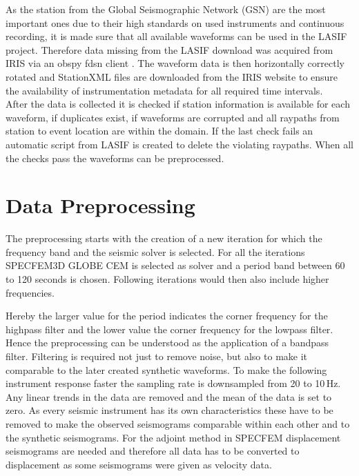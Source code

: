 As the station from the Global Seismographic Network (GSN) are the most important ones due to their high standards on used 
instruments and continuous recording, it is made sure that all available waveforms can be used in the LASIF project. 
Therefore data missing from the LASIF download was acquired from IRIS via an obspy fdsn client \citep{Krischer2015}. 
The waveform data is then horizontally correctly rotated and StationXML files are downloaded from the IRIS website to
ensure the availability of instrumentation metadata for all required time intervals. \\

After the data is collected it is checked if station information is available for each waveform, if duplicates exist, if 
waveforms are corrupted and all raypaths from station to event location are within the domain. 
If the last check fails an automatic script from LASIF is created to delete the violating raypaths. 
When all the checks pass the waveforms can be preprocessed. 



\section{Data Preprocessing}

The preprocessing starts with the creation of a new iteration for which the frequency band and the seismic solver is selected.
For all the iterations SPECFEM3D GLOBE CEM is selected as solver and a period band between 60 to 120 seconds is chosen.
Following iterations would then also include higher frequencies.


Hereby the larger value for the period indicates the corner frequency for the highpass filter and the lower value the 
corner frequency for the lowpass filter. Hence the preprocessing can be understood as the application of a bandpass filter. 
Filtering is required not just to remove noise, but also to make it comparable to the later created synthetic waveforms.
To make the following instrument response faster the sampling rate is downsampled from 20 to 10$\,$Hz.
Any linear trends in the data are removed and the mean of the data is set to zero.
%
As every seismic instrument has its own characteristics these have to be removed to make the observed seismograms 
comparable within each other and to the synthetic seismograms.
%
For the adjoint method in SPECFEM displacement seismograms are needed and therefore all data has to be converted to 
displacement as some seismograms were given as velocity data.

